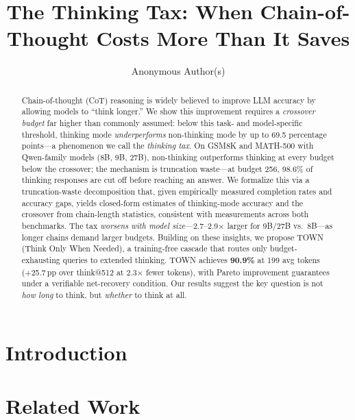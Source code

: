 \documentclass{article}
\title{The Thinking Tax: When Chain-of-Thought Costs More Than It Saves}
\author{
  Anonymous Author(s)
}
\newcommand{\method}{\textsc{TOWN}}
\newcommand{\fullmethod}{Think Only When Needed}
\theoremstyle{remark}
\begin{document}
\maketitle

\begin{abstract}
Chain-of-thought (CoT) reasoning is widely believed to improve LLM accuracy by allowing models to ``think longer.''
We show this improvement requires a \emph{crossover budget} far higher than commonly assumed: below this task- and model-specific threshold, thinking mode \emph{underperforms} non-thinking mode by up to 69.5 percentage points---a phenomenon we call the \emph{thinking tax}.
On GSM8K and MATH-500 with Qwen-family models (8B, 9B, 27B), non-thinking outperforms thinking at every budget below the crossover; the mechanism is truncation waste---at budget 256, 98.6\% of thinking responses are cut off before reaching an answer.
We formalize this via a truncation-waste decomposition that, given empirically measured completion rates and accuracy gaps, yields closed-form estimates of thinking-mode accuracy and the crossover from chain-length statistics, consistent with measurements across both benchmarks.
The tax \emph{worsens with model size}---2.7--2.9$\times$ larger for 9B/27B vs.\ 8B---as longer chains demand larger budgets.
Building on these insights, we propose \method{} (\fullmethod{}), a training-free cascade that routes only budget-exhausting queries to extended thinking.
\method{} achieves \textbf{90.9\%} at 199 avg tokens (+25.7\,pp over think@512 at 2.3$\times$ fewer tokens), with Pareto improvement guarantees under a verifiable net-recovery condition.
Our results suggest the key question is not \emph{how long} to think, but \emph{whether} to think at all.
\end{abstract}

\section{Introduction}
\label{sec:intro}



\section{Related Work}
\label{sec:related}
\end{document}
